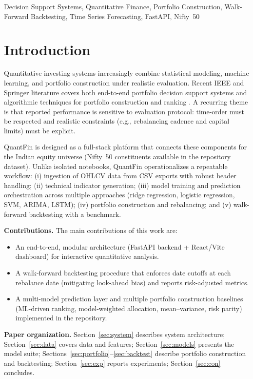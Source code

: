 \documentclass[conference]{IEEEtran}
\begin{document}
\begin{IEEEkeywords}
Decision Support Systems, Quantitative Finance, Portfolio Construction, Walk-Forward Backtesting, Time Series Forecasting, FastAPI, Nifty~50
\end{IEEEkeywords}
%
\section{Introduction}\label{sec:intro}
Quantitative investing systems increasingly combine statistical modeling, machine learning, and portfolio construction under realistic evaluation. Recent IEEE and Springer literature covers both end-to-end portfolio decision support systems and algorithmic techniques for portfolio construction and ranking \cite{aithal2023realtime,gunjan2022portfolioreview,saha2021stockranking}. A recurring theme is that reported performance is sensitive to evaluation protocol: time-order must be respected and realistic constraints (e.g., rebalancing cadence and capital limits) must be explicit.

QuantFin is designed as a full-stack platform that connects these components for the Indian equity universe (Nifty~50 constituents available in the repository dataset). Unlike isolated notebooks, QuantFin operationalizes a repeatable workflow: (i) ingestion of OHLCV data from CSV exports with robust header handling; (ii) technical indicator generation; (iii) model training and prediction orchestration across multiple approaches (ridge regression, logistic regression, SVM, ARIMA, LSTM); (iv) portfolio construction and rebalancing; and (v) walk-forward backtesting with a benchmark.

\textbf{Contributions.} The main contributions of this work are:
\begin{itemize}
\item An end-to-end, modular architecture (FastAPI backend + React/Vite dashboard) for interactive quantitative analysis.
\item A walk-forward backtesting procedure that enforces date cutoffs at each rebalance date (mitigating look-ahead bias) and reports risk-adjusted metrics.
\item A multi-model prediction layer and multiple portfolio construction baselines (ML-driven ranking, model-weighted allocation, mean--variance, risk parity) implemented in the repository.
\end{itemize}

\textbf{Paper organization.} Section~\ref{sec:system} describes system architecture; Section~\ref{sec:data} covers data and features; Section~\ref{sec:models} presents the model suite; Sections~\ref{sec:portfolio}--\ref{sec:backtest} describe portfolio construction and backtesting; Section~\ref{sec:exp} reports experiments; Section~\ref{sec:con} concludes.
\end{document}
